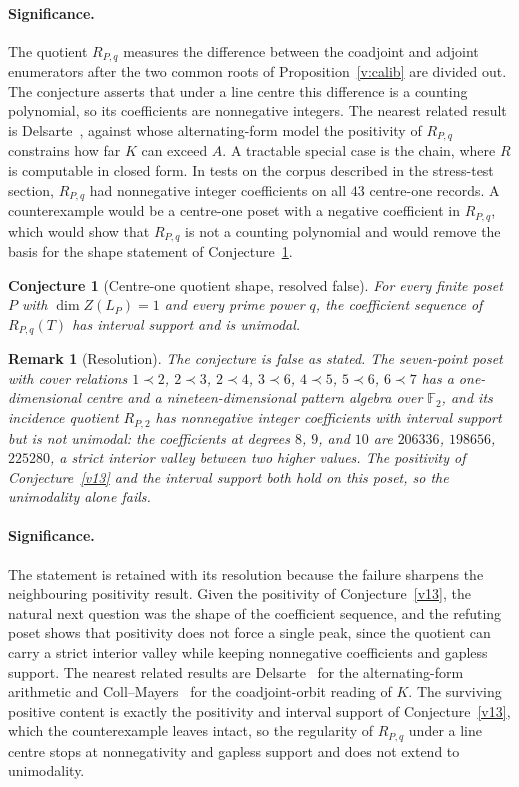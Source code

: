 \documentclass[11pt]{article}
\newtheorem{conjecture}{Conjecture}
\newtheorem{remark}{Remark}
\theoremstyle{definition}
\newcommand{\Fq}{\mathbb F}
\begin{document}
\paragraph{Significance.}
The quotient $R_{P,q}$ measures the difference between the coadjoint and adjoint enumerators after the two common roots of Proposition~\ref{v:calib} are divided out.  The conjecture asserts that under a line centre this difference is a counting polynomial, so its coefficients are nonnegative integers.  The nearest related result is Delsarte~\cite{Del}, against whose alternating-form model the positivity of $R_{P,q}$ constrains how far $K$ can exceed $A$.  A tractable special case is the chain, where $R$ is computable in closed form.  In tests on the corpus described in the stress-test section, $R_{P,q}$ had nonnegative integer coefficients on all $43$ centre-one records.  A counterexample would be a centre-one poset with a negative coefficient in $R_{P,q}$, which would show that $R_{P,q}$ is not a counting polynomial and would remove the basis for the shape statement of Conjecture~\ref{v14}.

\begin{conjecture}[Centre-one quotient shape, resolved false]\label{v14}
For every finite poset $P$ with $\dim Z(L_P)=1$ and every prime power $q$, the coefficient sequence of $R_{P,q}(T)$ has interval support and is unimodal.
\end{conjecture}

\begin{remark}[Resolution]\label{v14:res}
The conjecture is false as stated.  The seven-point poset with cover relations $1\prec2$, $2\prec3$, $2\prec4$, $3\prec6$, $4\prec5$, $5\prec6$, $6\prec7$ has a one-dimensional centre and a nineteen-dimensional pattern algebra over $\Fq_2$, and its incidence quotient $R_{P,2}$ has nonnegative integer coefficients with interval support but is not unimodal: the coefficients at degrees $8$, $9$, and $10$ are $206336$, $198656$, $225280$, a strict interior valley between two higher values.  The positivity of Conjecture~\ref{v13} and the interval support both hold on this poset, so the unimodality alone fails.
\end{remark}

\paragraph{Significance.}
The statement is retained with its resolution because the failure sharpens the neighbouring positivity result.  Given the positivity of Conjecture~\ref{v13}, the natural next question was the shape of the coefficient sequence, and the refuting poset shows that positivity does not force a single peak, since the quotient can carry a strict interior valley while keeping nonnegative coefficients and gapless support.  The nearest related results are Delsarte~\cite{Del} for the alternating-form arithmetic and Coll--Mayers~\cite{CM} for the coadjoint-orbit reading of $K$.  The surviving positive content is exactly the positivity and interval support of Conjecture~\ref{v13}, which the counterexample leaves intact, so the regularity of $R_{P,q}$ under a line centre stops at nonnegativity and gapless support and does not extend to unimodality.
\end{document}
